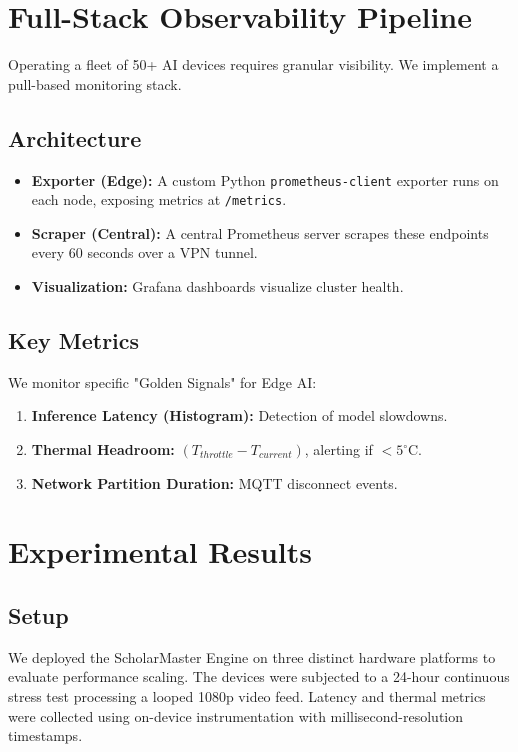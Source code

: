 \documentclass[conference]{IEEEtran}
\begin{document}
\section{Full-Stack Observability Pipeline}
Operating a fleet of 50+ AI devices requires granular visibility. We implement a pull-based monitoring stack.

\subsection{Architecture}
\begin{itemize}
    \item \textbf{Exporter (Edge):} A custom Python \texttt{prometheus-client} exporter runs on each node, exposing metrics at \texttt{/metrics}.
    \item \textbf{Scraper (Central):} A central Prometheus server scrapes these endpoints every 60 seconds over a VPN tunnel.
    \item \textbf{Visualization:} Grafana dashboards visualize cluster health.
\end{itemize}

\subsection{Key Metrics}
We monitor specific "Golden Signals" for Edge AI:
\begin{enumerate}
    \item \textbf{Inference Latency (Histogram):} Detection of model slowdowns.
    \item \textbf{Thermal Headroom:} $(T_{throttle} - T_{current})$, alerting if $< 5^{\circ}$C.
    \item \textbf{Network Partition Duration:} MQTT disconnect events.
\end{enumerate}

\section{Experimental Results}

\subsection{Setup}
We deployed the ScholarMaster Engine on three distinct hardware platforms to evaluate performance scaling. The devices were subjected to a 24-hour continuous stress test processing a looped 1080p video feed. Latency and thermal metrics were collected using on-device instrumentation with millisecond-resolution timestamps.
\end{document}
